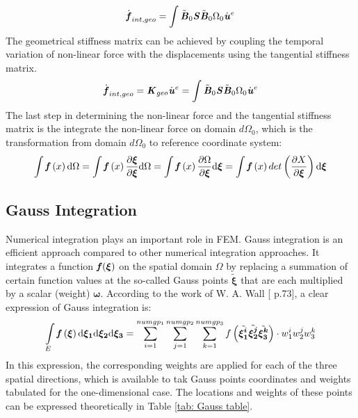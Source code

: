 \begin{equation}
\dot{\textbf{\textit{f}}}_{int,geo} = \int \tilde{\textbf{\textit{B}}}_0 \textbf{\textit{S}} \tilde{\textbf{\textit{B}}}_0 \mathrm{\Omega_0} \dot{\textbf{\textit{u}}}^e
\end{equation}
The geometrical stiffness matrix can be achieved by coupling the temporal variation of non-linear force with the displacements using the tangential stiffness matrix.
\begin{equation}
\dot{\textbf{\textit{f}}}_{int,geo} = \textbf{\textit{K}}_{geo} \dot{\textbf{\textit{u}}}^e =\int \tilde{\textbf{\textit{B}}}_0 \textbf{\textit{S}} \tilde{\textbf{\textit{B}}}_0 \mathrm{\Omega_0} \dot{\textbf{\textit{u}}}^e
\end{equation}
The last step in determining the non-linear force and the tangential stiffness matrix is the integrate the non-linear force on domain $d\Omega_0$, which is the transformation from domain $d\Omega_0$ to reference coordinate system:
\begin{equation}
\int {\textbf{\textit{f}}}\left(x\right) \mathrm{d}\Omega = \int {\textbf{\textit{f}}}\left(x\right) \frac{\partial \boldsymbol{\xi}}{\partial \boldsymbol{\xi}} \mathrm{d}\Omega = \int {\textbf{\textit{f}}}\left(x\right) \frac{\partial \Omega}{\partial \boldsymbol{\xi}} \mathrm{d}\boldsymbol{\xi} = \int {\textbf{\textit{f}}}\left(x\right) det \left(\frac{\partial X}{\partial \boldsymbol{\xi}}\right) \mathrm{d}\boldsymbol{\xi}
\end{equation}


\subsection{Gauss Integration}
Numerical integration plays an important role in FEM. Gauss integration is an efficient approach compared to other numerical integration approaches. It integrates a function $\textbf{\textit{f}}(\boldsymbol{\xi})$ on the spatial domain $\Omega$ by replacing a summation of certain function values at the so-called Gauss points $\tilde{\boldsymbol{\xi}}$ that are each multiplied by a scalar (weight) $\boldsymbol{\omega}$.  According to the work of W. A. Wall [\cite{FiniteElement} p.73], a clear expression of Gauss integration is:
\begin{equation}
\int \limits_E {\textbf{\textit{f}}} \left(\boldsymbol{\xi}\right) \mathrm{d\boldsymbol{\xi_1}}\mathrm{d\boldsymbol{\xi_2}}\mathrm{d\boldsymbol{\xi_3}} = \displaystyle\sum_{i=1}^{numgp_1}\displaystyle\sum_{j=1}^{numgp_2} \displaystyle\sum_{k=1}^{numgp_3} f\left(\tilde{\boldsymbol{\xi_1^i}}\tilde{\boldsymbol{\xi_2^j}}\tilde{\boldsymbol{\xi_3^k}}\right)\cdot w_1^i w_2^j w_3^k
\end{equation}
In this expression, the corresponding weights are applied for each of the three spatial directions, which is available to tak Gauss points coordinates and weights tabulated for the one-dimensional case. The locations and weights of these points can be expressed theoretically in Table \ref{tab: Gauss table}.
	
